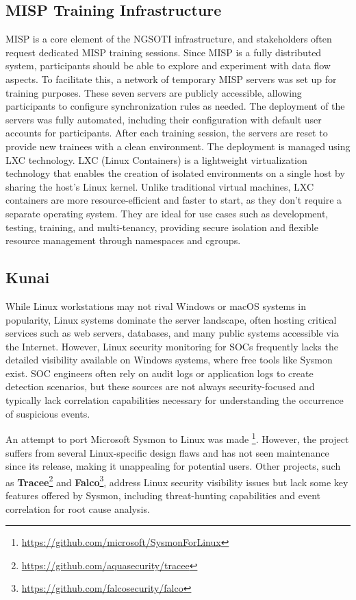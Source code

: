 \subsection{MISP Training Infrastructure}
MISP is a core element of the NGSOTI infrastructure, and stakeholders often request dedicated MISP training sessions. Since MISP is a fully distributed system, participants should be able to explore and experiment with data flow aspects. To facilitate this, a network of temporary MISP servers was set up for training purposes. These seven servers are publicly accessible, allowing participants to configure synchronization rules as needed. The deployment of the servers was fully automated, including their configuration with default user accounts for participants. After each training session, the servers are reset to provide new trainees with a clean environment. The deployment is managed using LXC technology. LXC (Linux Containers) is a lightweight virtualization technology that enables the creation of isolated environments on a single host by sharing the host's Linux kernel. Unlike traditional virtual machines, LXC containers are more resource-efficient and faster to start, as they don't require a separate operating system. They are ideal for use cases such as development, testing, training, and multi-tenancy, providing secure isolation and flexible resource management through namespaces and cgroups.


\subsection{Kunai}

While Linux workstations may not rival Windows or macOS systems in popularity, Linux systems dominate the server landscape, often hosting critical services such as web servers, databases, and many public systems accessible via the Internet. However, Linux security monitoring for SOCs frequently lacks the detailed visibility available on Windows systems, where free tools like Sysmon\cite{sysmon_tool} exist. SOC engineers often rely on audit logs or application logs to create detection scenarios, but these sources are not always security-focused and typically lack correlation capabilities necessary for understanding the occurrence of suspicious events.

An attempt to port Microsoft Sysmon to Linux was made
\footnote{\href{https://github.com/microsoft/SysmonForLinux}{https://github.com/microsoft/SysmonForLinux}}.
However, the project suffers from several Linux-specific design flaws and has
not seen maintenance since its release, making it unappealing for potential
users. Other projects, such as
\textbf{Tracee}\footnote{\href{https://github.com/aquasecurity/tracee}{https://github.com/aquasecurity/tracee}}
and \textbf{Falco}\footnote{\href{https://github.com/falcosecurity/falco}{https://github.com/falcosecurity/falco}},
address Linux security visibility issues but lack some key features offered by Sysmon,
including threat-hunting capabilities and event correlation for root cause analysis.

